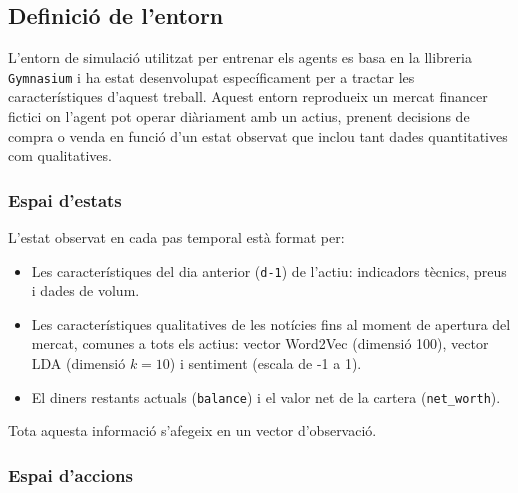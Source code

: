 \documentclass[12pt,a4paper,twoside]{book}
\begin{document}
\subsection{Definició de l'entorn}
L'entorn de simulació utilitzat per entrenar els agents es basa en la llibreria \texttt{Gymnasium} i ha estat desenvolupat específicament per a tractar les característiques d'aquest treball. Aquest entorn reprodueix un mercat financer fictici on l'agent pot operar diàriament amb un actius, prenent decisions de compra o venda en funció d'un estat observat que inclou tant dades quantitatives com qualitatives.

\subsubsection{Espai d'estats}

L'estat observat en cada pas temporal està format per:
\begin{itemize}
    \item Les característiques del dia anterior (\texttt{d-1}) de l'actiu: indicadors tècnics, preus i dades de volum.
    \item Les característiques qualitatives de les notícies fins al moment de apertura del mercat, comunes a tots els actius: vector Word2Vec (dimensió 100), vector LDA (dimensió $k=10$) i sentiment (escala de -1 a 1).
    \item El diners restants actuals (\texttt{balance}) i el valor net de la cartera (\texttt{net\_worth}).
\end{itemize}

Tota aquesta informació s'afegeix en un vector d'observació.

\subsubsection{Espai d'accions}
\end{document}
